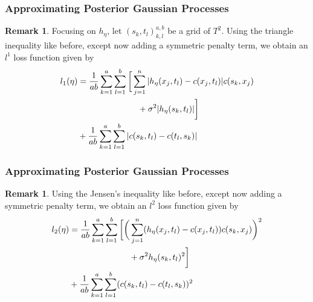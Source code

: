 \documentclass[notheorems]{beamer}
\theoremstyle{definition}
\newtheorem{rem}[definition]{Remark}
\newcommand{\sig}{\sigma}
\begin{document}
\begin{frame}
\frametitle{Approximating Posterior Gaussian Processes}
\begin{rem}
Focusing on $h_{\eta}$, let $(s_k, t_l)_{k,l}^{a,b}$ be a grid of $T^2$. Using the triangle inequality like before, except now adding a symmetric penalty term, we obtain an $l^1$ loss function given by
\begin{align*}
        l_1(\eta) 
    &= \frac{1}{ab} \sum\limits_{k=1}^a \sum\limits_{l=1}^b  \bigg [ \sum\limits_{j=1}^n |h_{\eta}(x_j, t_l) - c(x_j, t_l)| c(s_k, x_j)   \\
    & \hspace{2.5cm} + \sig^{2}  |h_{\eta}(s_k, t_l)| \bigg] \\
    &  + \frac{1}{ab} \sum\limits_{k=1}^a \sum\limits_{l=1}^b |c(s_k, t_l) - c(t_l, s_k)|
    \end{align*}
\end{rem}

\end{frame}














\begin{frame}
\frametitle{Approximating Posterior Gaussian Processes}
\begin{rem}
Using the Jensen's inequality like before, except now adding a symmetric penalty term, we obtain an $l^2$  loss function given by
\begin{align*}
        l_2(\eta) 
        &= \frac{1}{ab} \sum\limits_{k=1}^a \sum\limits_{l=1}^b  \bigg [ \bigg(\sum\limits_{j=1}^n (h_{\eta}(x_j, t_l) - c(x_j, t_l)) c(s_k, x_j) \bigg)^2   \\
    & \hspace{2.5cm} + \sig^{2}  h_{\eta}(s_k, t_l)^2 \bigg] \\
        &+ \frac{1}{ab} \sum\limits_{k=1}^a \sum\limits_{l=1}^b (c(s_k, t_l) - c(t_l, s_k))^2
    \end{align*}
\end{rem}

\end{frame}
\end{document}
